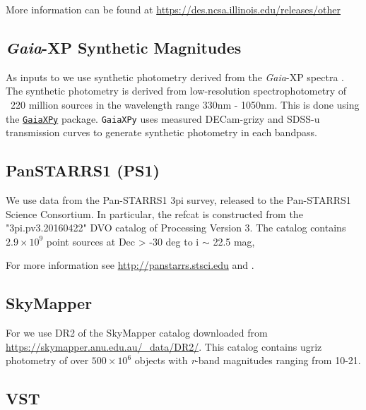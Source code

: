 More information can be found at \url{https://des.ncsa.illinois.edu/releases/other}


\subsection{\emph{Gaia}-XP Synthetic Magnitudes}
\label{sec:gaiaxp}
As inputs to \monster we use synthetic photometry derived from the \emph{Gaia}-XP spectra \citep{GaiaCollaboration:2023-XP}. 
The synthetic photometry is derived from low-resolution spectrophotometry of ~220 million sources in the wavelength range 330nm - 1050nm. 
This is done using the \href{https://github.com/gaia-dpci/GaiaXPy/cd}{\texttt{GaiaXPy}} package. 
\texttt{GaiaXPy} uses measured DECam-grizy and SDSS-u transmission curves to generate synthetic photometry in each bandpass. 


\subsection{PanSTARRS1 (PS1)}
\label{sec:ps1}

We use data from the Pan-STARRS1 3pi survey, released to the Pan-STARRS1 Science Consortium.
In particular, the refcat is constructed from the "3pi.pv3.20160422" DVO catalog of Processing Version 3.
The catalog contains $2.9 \times 10^9$ point sources at Dec > -30 deg to i $\sim$ 22.5 mag,

For more information see \url{http://panstarrs.stsci.edu} and \citet{Chambers:2016}.

\subsection{SkyMapper}
\label{sec:skymapper}
For \monster we use DR2 of the SkyMapper catalog \citep{Onken:2019} downloaded from \url{https://skymapper.anu.edu.au/_data/DR2/}. 
This catalog contains ugriz photometry of over $500 \times 10^6$ objects with \textit{r}-band magnitudes ranging from 10-21. 

\subsection{VST}
\label{sec:vst}

